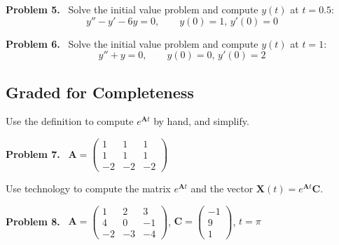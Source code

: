 \documentclass[12pt]{article}
\theoremstyle{definition}
\newcommand{\bA}{\mathbf{A}}
\newcommand{\bC}{\mathbf{C}}
\newcommand{\bX}{\mathbf{X}}
\newcommand{\exer}[1]{\noindent \textbf{Problem #1.} \,}
\newcommand{\ds}{\displaystyle}
\begin{document}
\exer{5}  Solve the initial value problem and compute $y(t)$ at $t=0.5$:
	$$y'' - y' - 6 y = 0, \qquad y(0)=1, \, y'(0)=0$$

\exer{6}  Solve the initial value problem and compute $y(t)$ at $t=1$:
	$$y'' + y = 0, \qquad y(0)=0, \, y'(0)=2$$


\subsection*{Graded for Completeness}

Use the definition to compute $e^{\bA t}$ by hand, and simplify.

\exer{7}  $\ds \bA = \begin{pmatrix} 1 & 1 & 1 \\ 1 & 1 & 1 \\ -2 & -2 & -2 \end{pmatrix}$

\medskip
Use technology to compute the matrix $e^{\bA t}$ and the vector $\bX(t) = e^{\bA t} \bC$.

\exer{8}  $\ds \bA = \begin{pmatrix} 1 & 2 & 3 \\ 4 & 0 & -1 \\ -2 & -3 & -4 \end{pmatrix}$, $\ds \bC = \begin{pmatrix} -1 \\ 9 \\ 1 \end{pmatrix}$, $t=\pi$
\end{document}
